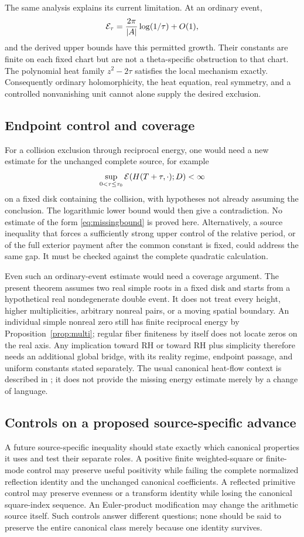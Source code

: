 The same analysis explains its current limitation. At an ordinary event,
\[
 \mathcal E_\tau=\frac{2\pi}{|A|}\log(1/\tau)+O(1),
\]
and the derived upper bounds have this permitted growth. Their constants
are finite on each fixed chart but are not a theta-specific obstruction
to that chart. The polynomial heat family $z^2-2\tau$ satisfies the local
mechanism exactly. Consequently ordinary holomorphicity, the heat
equation, real symmetry, and a controlled nonvanishing unit cannot alone
supply the desired exclusion.

\subsection{Endpoint control and coverage}
For a collision exclusion through reciprocal energy, one would need a
new estimate for the unchanged complete source, for example
\begin{equation}\label{eq:missingbound}
 \sup_{0<\tau\le\tau_0}\mathcal E(H(T+\tau,\cdot);D)<\infty
\end{equation}
on a fixed disk containing the collision, with hypotheses not already
assuming the conclusion. The logarithmic lower bound would then give
a contradiction. No estimate of the form \eqref{eq:missingbound} is
proved here. Alternatively, a source inequality that forces a sufficiently
strong upper control of the relative period, or of the full exterior
payment after the common constant is fixed, could address the same gap.
It must be checked against the complete quadratic calculation.

Even such an ordinary-event estimate would need a coverage argument.
The present theorem assumes two real simple roots in a fixed disk and
starts from a hypothetical real nondegenerate double event. It does not
treat every height, higher multiplicities, arbitrary nonreal pairs,
or a moving spatial boundary. An individual simple nonreal zero still
has finite reciprocal energy by Proposition~\ref{prop:multi}; regular
fiber finiteness by itself does not locate zeros on the real axis.
Any implication toward RH or toward RH plus simplicity therefore needs
an additional global bridge, with its reality regime, endpoint passage,
and uniform constants stated separately. The usual canonical heat-flow
context is described in \cite{RT}; it does not provide the missing
energy estimate merely by a change of language.

\subsection{Controls on a proposed source-specific advance}
A future source-specific inequality should state exactly which canonical
properties it uses and test their separate roles. A positive finite
weighted-square or finite-mode control may preserve useful positivity
while failing the complete normalized reflection identity and the
unchanged canonical coefficients. A reflected primitive control may
preserve evenness or a transform identity while losing the canonical
square-index sequence. An Euler-product modification may change the
arithmetic source itself. Such controls answer different questions;
none should be said to preserve the entire canonical class merely
because one identity survives.

